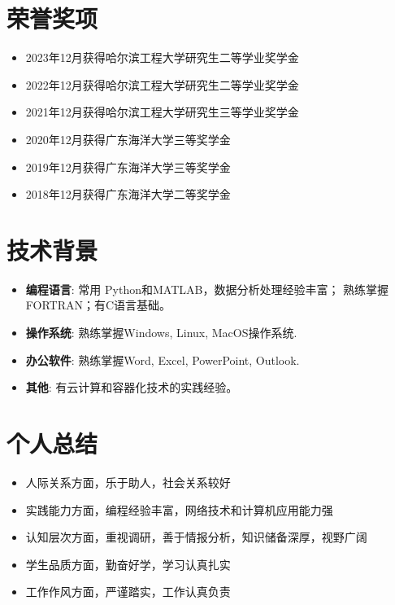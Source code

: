 \documentclass{resume}
\begin{document}
\section[荣誉奖项]{荣誉奖项}
\begin{itemize}
  \item {2023年12月获得哈尔滨工程大学研究生二等学业奖学金}
  \item {2022年12月获得哈尔滨工程大学研究生二等学业奖学金}
  \item {2021年12月获得哈尔滨工程大学研究生三等学业奖学金}
  \item {2020年12月获得广东海洋大学三等奖学金}
  \item {2019年12月获得广东海洋大学三等奖学金}
  \item {2018年12月获得广东海洋大学二等奖学金}
\end{itemize}

\section[技术背景]{技术背景}
\begin{itemize}
  \item \textbf{编程语言}: 常用 Python和MATLAB，数据分析处理经验丰富； 熟练掌握FORTRAN；有C语言基础。
  \item \textbf{操作系统}: 熟练掌握Windows, Linux, MacOS操作系统.
    \item \textbf{办公软件}: 熟练掌握Word, Excel, PowerPoint, Outlook.
  \item \textbf{其他}: 有云计算和容器化技术的实践经验。
\end{itemize}



\section{个人总结}

\begin{itemize}
  \item 人际关系方面，乐于助人，社会关系较好
\item 实践能力方面，编程经验丰富，网络技术和计算机应用能力强
\item 认知层次方面，重视调研，善于情报分析，知识储备深厚，视野广阔
\item 学生品质方面，勤奋好学，学习认真扎实
\item 工作作风方面，严谨踏实，工作认真负责
\end{itemize}
\end{document}
